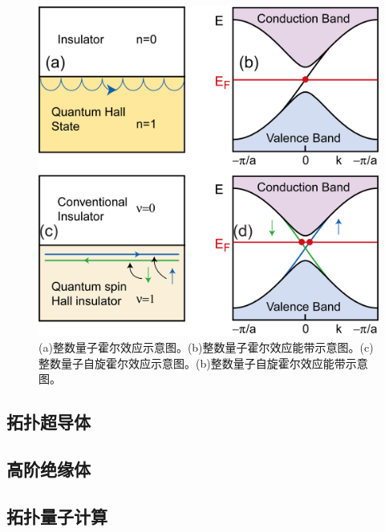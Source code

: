 \begin{figure}
\centering
\includegraphics[scale=0.5]{pic/fig1.png}
\caption{(a)整数量子霍尔效应示意图。(b)整数量子霍尔效应能带示意图。(c)整数量子自旋霍尔效应示意图。(b)整数量子自旋霍尔效应能带示意图。}
\end{figure}

\subsection{拓扑超导体}
\subsection{高阶绝缘体}
\subsection{拓扑量子计算}

